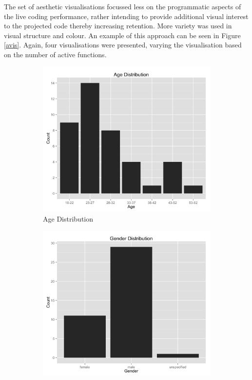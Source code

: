 \documentclass{article}
\begin{document}
The set of aesthetic visualisations focussed less on the programmatic aspects of the live coding performance, rather intending to provide additional visual interest to the projected code thereby increasing retention. More variety was used in visual structure and colour. An example of this approach can be seen in Figure \ref{avis}. Again, four visualisations were presented, varying the visualisation based on the number of active functions.\\


\begin{figure}[H]
\centering
\begin{subfigure}{.5\textwidth}
    \centering
    \includegraphics[width=1.0\linewidth]{graphs/age.png}
    \caption{Age Distribution}
    \label{agedistribution}
\end{subfigure}%
\begin{subfigure}{.5\textwidth}
    \centering
    \includegraphics[width=1.0\linewidth]{graphs/gender.png}

\end{subfigure}
\end{figure}
\end{document}
